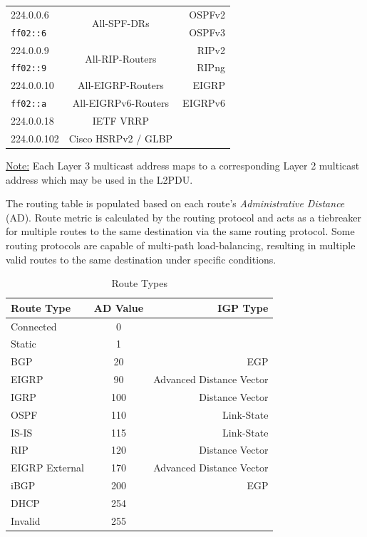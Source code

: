 \documentclass[12pt]{article}
\newif\ifcolor											%
\newcommand{\note}[1]{\ifcolor \colorbox{#1}{Note:}\else \underline{Note:}\fi}
\newcommand{\mr}[2]{\multirow{#1}{*}{#2}}
\begin{document}
\begin{table}[H]
\begin{minipage}{.6\linewidth}
\begin{tabular}{| l | c | r |}
	224.0.0.6		& \mr{2}{All-SPF-DRs}		& OSPFv2\\
	\texttt{ff02::6}	&					& OSPFv3\\\hline
	224.0.0.9		& \mr{2}{All-RIP-Routers}	& RIPv2\\
	\texttt{ff02::9}	&					& RIPng\\\hline
	224.0.0.10		& All-EIGRP-Routers		& EIGRP\\
	\texttt{ff02::a}	& All-EIGRPv6-Routers		& EIGRPv6\\\hline
	224.0.0.18		& IETF VRRP			&\\\hline
	224.0.0.102		& Cisco HSRPv2 / GLBP		&\\\hline
	\end{tabular}\end{minipage}\end{table}
	\note{Goldenrod} Each Layer 3 multicast address maps to a corresponding Layer 2 multicast address which may be used in the L2PDU.

	The routing table is populated based on each route's \textit{Administrative Distance} (AD). Route metric is calculated by the routing protocol and acts as a tiebreaker for multiple routes to the same destination via the same routing protocol. Some routing protocols are capable of multi-path load-balancing, resulting in multiple valid routes to the same destination under specific conditions.

	\begin{table}[H]
	\centering
	\caption{Route Types \label{tab:ROUTE TYPES}}
	\begin{tabular}{@{} l c r @{}}\hline
	\textbf{Route Type}	& \textbf{AD Value}	& \textbf{IGP Type}\\\hline
	Connected 			& 0				&\\
	Static				& 1				&\\
	BGP				& 20				& EGP\\
	EIGRP				& 90				& Advanced Distance Vector\\
	IGRP				& 100				& Distance Vector\\
	OSPF				& 110				& Link-State\\
	IS-IS				& 115				& Link-State\\
	RIP				& 120				& Distance Vector\\
	EIGRP External		& 170				& Advanced Distance Vector\\
	iBGP				& 200				& EGP\\
	DHCP			& 254				&\\
	Invalid			& 255				&\\\hline
	\end{tabular}\end{table}
\end{document}
